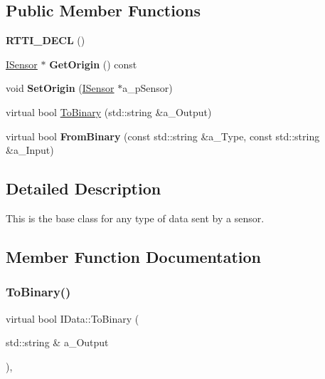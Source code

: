 \subsection*{Public Member Functions}
\begin{DoxyCompactItemize}
\item 
\mbox{\label{class_i_data_acdd36c3c0e577bc44eb5df14aad0fe8d}} 
{\bfseries R\+T\+T\+I\+\_\+\+D\+E\+CL} ()
\item 
\mbox{\label{class_i_data_aaf249fea6a9510e211d2812deceadf6a}} 
\hyperlink{class_i_sensor}{I\+Sensor} $\ast$ {\bfseries Get\+Origin} () const
\item 
\mbox{\label{class_i_data_a0f936ff9f2310ff48a6b7672a7579a78}} 
void {\bfseries Set\+Origin} (\hyperlink{class_i_sensor}{I\+Sensor} $\ast$a\+\_\+p\+Sensor)
\item 
virtual bool \hyperlink{class_i_data_a24bd9f1e78807b0101ffe2cb8e38f860}{To\+Binary} (std\+::string \&a\+\_\+\+Output)
\item 
\mbox{\label{class_i_data_a019510bb815e82eefec404099b158096}} 
virtual bool {\bfseries From\+Binary} (const std\+::string \&a\+\_\+\+Type, const std\+::string \&a\+\_\+\+Input)
\end{DoxyCompactItemize}


\subsection{Detailed Description}
This is the base class for any type of data sent by a sensor. 

\subsection{Member Function Documentation}
\mbox{\label{class_i_data_a24bd9f1e78807b0101ffe2cb8e38f860}} 
\subsubsection{\texorpdfstring{To\+Binary()}{ToBinary()}}
{\footnotesize\ttfamily virtual bool I\+Data\+::\+To\+Binary (\begin{DoxyParamCaption}\item[{std\+::string \&}]{a\+\_\+\+Output }\end{DoxyParamCaption})\hspace{0.3cm}{\ttfamily [inline]}, {\ttfamily [virtual]}}

